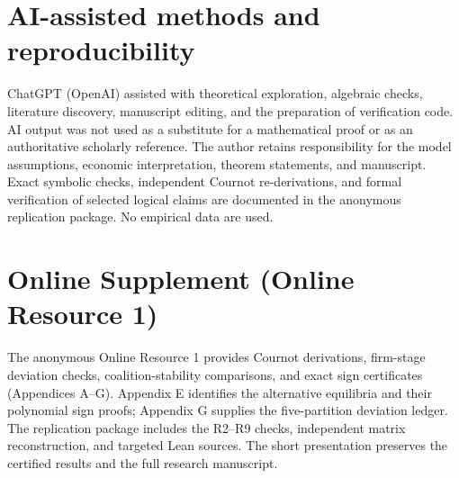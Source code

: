 \documentclass[12pt,review,authoryear,nopreprintline]{elsarticle}
\begin{document}
\makeatletter
{}
\makeatother







\section*{AI-assisted methods and reproducibility}
ChatGPT (OpenAI) assisted with theoretical exploration, algebraic checks,
literature discovery, manuscript editing, and the preparation of verification
code. AI output was not used as a substitute for a mathematical proof or as
an authoritative scholarly reference. The author retains responsibility for
the model assumptions, economic interpretation, theorem statements, and
manuscript. Exact symbolic checks, independent Cournot re-derivations, and
formal verification of selected logical claims are documented in the
anonymous replication package. No empirical data are used.

\section*{Online Supplement (Online Resource 1)}
The anonymous Online Resource 1 provides Cournot derivations, firm-stage deviation checks, coalition-stability comparisons, and exact sign certificates (Appendices A--G). Appendix E identifies the alternative equilibria and their polynomial sign proofs; Appendix G supplies the five-partition deviation ledger. The replication package includes the R2--R9 checks, independent matrix reconstruction, and targeted Lean sources. The short presentation preserves the certified results and the full research manuscript.



\end{document}
